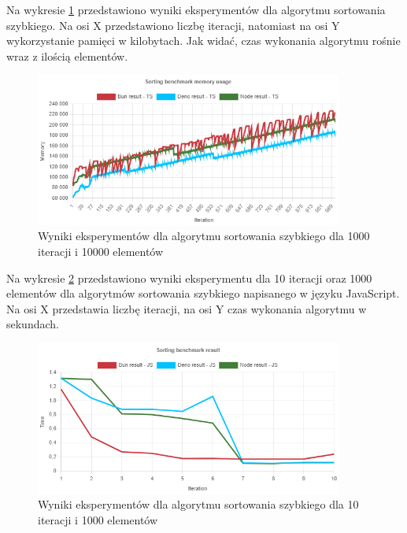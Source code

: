 Na wykresie \ref{fig:radix_sorting_e6_memory_ts} przedstawiono wyniki eksperymentów dla algorytmu sortowania szybkiego. Na osi X przedstawiono liczbę iteracji, natomiast na osi Y wykorzystanie pamięci w kilobytach. Jak widać, czas wykonania algorytmu rośnie wraz z ilością elementów.
\begin{figure}[H]
  \centering
  \includegraphics[width=0.9\textwidth]{Figures/sorting/radix/e6_memory_ts.png}
  \caption{Wyniki eksperymentów dla algorytmu sortowania szybkiego dla 1000 iteracji i 10000 elementów}
  \label{fig:radix_sorting_e6_memory_ts}
\end{figure}Na wykresie \ref{fig:radix_sorting_e1_js} przedstawiono wyniki eksperymentu dla 10 iteracji oraz 1000 elementów dla algorytmów sortowania szybkiego napisanego w języku JavaScript. Na osi X przedstawia liczbę iteracji, na osi Y czas wykonania algorytmu w sekundach. 

\begin{figure}[H]
  \centering
  \includegraphics[width=0.9\textwidth]{Figures/sorting/radix/e1_js.png}
  \caption{Wyniki eksperymentów dla algorytmu sortowania szybkiego dla 10 iteracji i 1000 elementów}
  \label{fig:radix_sorting_e1_js}
\end{figure}

